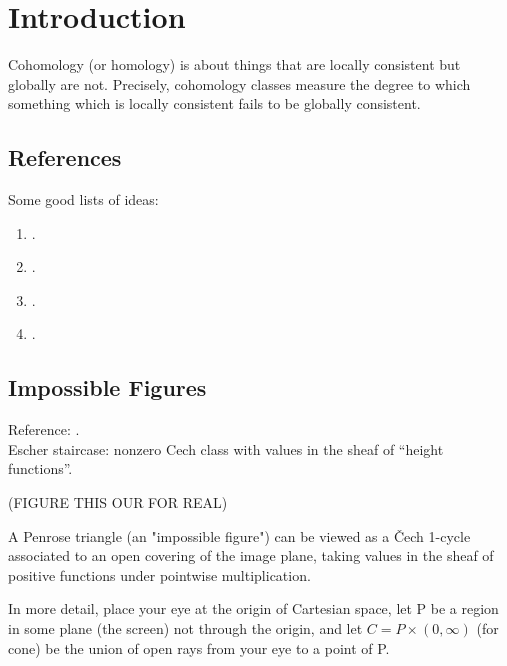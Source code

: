 \documentclass[12pt]{article}
\begin{document}
\section{Introduction}

Cohomology (or homology) is about things that are locally consistent but globally are not. Precisely, cohomology classes measure the degree to which something which is locally consistent fails to be globally consistent.

\subsection{References}

Some good lists of ideas:
\begin{enumerate}
\item {}.

\item {}.

\item {}.

\item {}.
\end{enumerate}

\subsection{Impossible Figures}

Reference: .
\bigskip\\ 
Escher staircase: nonzero Cech class with values in the sheaf of ``height functions''.




(FIGURE THIS OUR FOR REAL)

A Penrose triangle (an "impossible figure") can be viewed as a Čech 1-cycle associated to an open covering of the image plane, taking values in the sheaf of positive functions under pointwise multiplication.

In more detail, place your eye at the origin of Cartesian space, let P be a region in some plane (the screen) not through the origin, and let $C = P \times (0, \infty)$ (for cone) be the union of open rays from your eye to a point of P.
\end{document}
